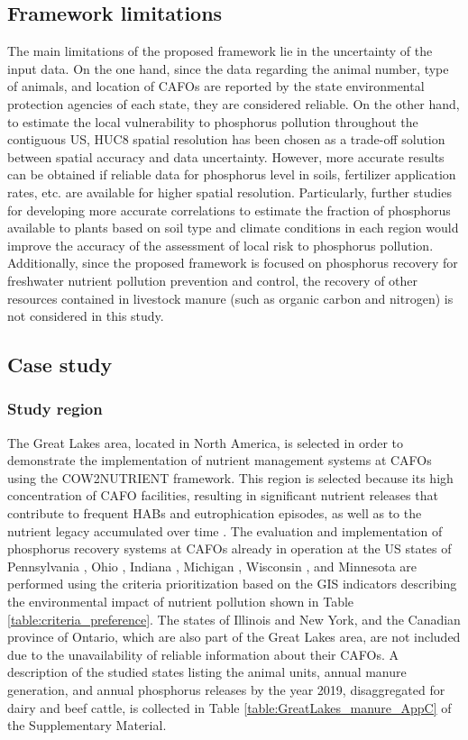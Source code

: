 \begin{refsection}[referencesCh4]
\subsection{Framework limitations}
The main limitations of the proposed framework lie in the uncertainty of the input data. On the one hand, since the data regarding the animal number, type of animals, and location of CAFOs are reported by the state environmental protection agencies of each state, they are considered reliable. On the other hand, to estimate the local vulnerability to phosphorus pollution throughout the contiguous US, HUC8 spatial resolution has been chosen as a trade-off solution between spatial accuracy and data uncertainty. However, more accurate results can be obtained if reliable data for phosphorus level in soils, fertilizer  application rates, etc. are available for higher spatial resolution. Particularly, further studies for developing more accurate correlations to estimate the fraction of phosphorus available to plants based on soil type and climate conditions in each region would improve the accuracy of the assessment of local risk to phosphorus pollution. Additionally, since the proposed framework is focused on phosphorus recovery for freshwater nutrient pollution prevention and control, the recovery of other resources contained in livestock manure (such as organic carbon and nitrogen) is not considered in this study.

\subsection{Case study}
\subsubsection{Study region}
The Great Lakes area, located in North America, is selected in order to demonstrate the implementation of nutrient management systems at CAFOs using the COW2NUTRIENT framework. This region is selected because its high concentration of CAFO facilities, resulting in significant nutrient releases that contribute to frequent HABs and eutrophication episodes,
as well as to the nutrient legacy accumulated over time \citep{sayers2019satellite, han2012historical}. The evaluation and implementation of phosphorus recovery systems at CAFOs already in operation at the US states of Pennsylvania \citep{Pennsylvania_CAFOS}, Ohio \citep{Ohio_CAFOS}, Indiana \citep{Indiana_CAFOS}, Michigan \citep{Michigan_CAFOS}, Wisconsin \citep{Wisconsin_CAFOS}, and Minnesota \citep{Minnesota_CAFOS} are performed using the criteria prioritization based on the GIS indicators describing 
the environmental impact of nutrient pollution shown
in Table \ref{table:criteria_preference}. The states of Illinois and New York, and the Canadian province of Ontario, which are also part of the Great Lakes area, are not included due to the unavailability of reliable information about their CAFOs. A description of the studied states listing the animal units, annual manure generation, and annual phosphorus releases by the year 2019, disaggregated for dairy and beef cattle, is collected in Table \ref{table:GreatLakes_manure_AppC} of the Supplementary Material. 


\end{refsection}
